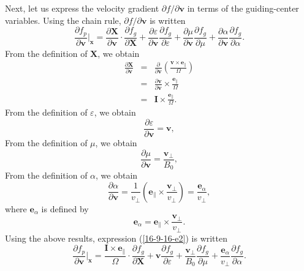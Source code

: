 \documentclass{llncs}
\newcommand{\nobracket}{}
\newcommand{\tmmathbf}[1]{\ensuremath{\boldsymbol{#1}}}
\begin{document}
Next, let us express the velocity gradient $\partial f / \partial \mathbf{v}$
in terms of the guiding-center variables. Using the chain rule, $\partial f /
\partial \mathbf{v}$ is written
\begin{equation}
  \label{16-9-16-e2} \frac{\partial f_p}{\partial \mathbf{v}} |_{\mathbf{x}}
  \nobracket = \frac{\partial \mathbf{X}}{\partial \mathbf{v}} \cdot
  \frac{\partial f_g}{\partial \mathbf{X}} + \frac{\partial
  \varepsilon}{\partial \mathbf{v}}  \frac{\partial f_g}{\partial \varepsilon}
  + \frac{\partial \mu}{\partial \mathbf{v}}  \frac{\partial f_g}{\partial
  \mu} + \frac{\partial \alpha}{\partial \mathbf{v}}  \frac{\partial
  f_g}{\partial \alpha} .
\end{equation}
From the definition of $\mathbf{X}$, we obtain
\begin{eqnarray}
  \frac{\partial \mathbf{X}}{\partial \mathbf{v}} & = &
  \frac{\partial}{\partial \mathbf{v}} \left( \frac{\tmmathbf{v} \times
  \tmmathbf{e}_{\parallel}}{\Omega} \right) \nonumber\\
  & = &  \frac{\partial \mathbf{v}}{\partial \mathbf{v}} \times
  \frac{\tmmathbf{e}_{\parallel}}{\Omega} \nonumber\\
  & = & \mathbf{I} \times \frac{\tmmathbf{e}_{\parallel}}{\Omega} . 
\end{eqnarray}
From the definition of $\varepsilon$, we obtain
\begin{equation}
  \frac{\partial \varepsilon}{\partial \mathbf{v}} =\mathbf{v},
\end{equation}
From the definition of $\mu$, we obtain
\begin{equation}
  \frac{\partial \mu}{\partial \mathbf{v}} = \frac{\mathbf{v}_{\perp}}{B_0},
\end{equation}
From the definition of $\alpha$, we obtain
\begin{equation}
  \frac{\partial \alpha}{\partial \mathbf{v}} = \frac{1}{v_{\perp}} \left(
  \tmmathbf{e}_{\parallel} \times \frac{\mathbf{v}_{\perp}}{v_{\perp}} \right)
  = \frac{\tmmathbf{e}_{\alpha}}{v_{\perp}},
\end{equation}
where $\mathbf{e}_{\alpha}$ is defined by
\begin{equation}
  \tmmathbf{e}_{\alpha} = \tmmathbf{e}_{\parallel} \times
  \frac{\mathbf{v}_{\perp}}{v_{\perp}} .
\end{equation}
Using the above results, expression (\ref{16-9-16-e2}) is written
\begin{equation}
  \frac{\partial f_p}{\partial \mathbf{v}} |_{\mathbf{x}} \nobracket =
  \frac{\mathbf{I} \times \tmmathbf{e}_{\parallel}}{\Omega} \cdot
  \frac{\partial f_g}{\partial \mathbf{X}} +\mathbf{v} \frac{\partial
  f_g}{\partial \varepsilon} + \frac{\mathbf{v}_{\perp}}{B_0} \frac{\partial
  f_g}{\partial \mu} + \frac{\tmmathbf{e}_{\alpha}}{v_{\perp}}  \frac{\partial
  f_g}{\partial \alpha} .
\end{equation}
\end{document}
